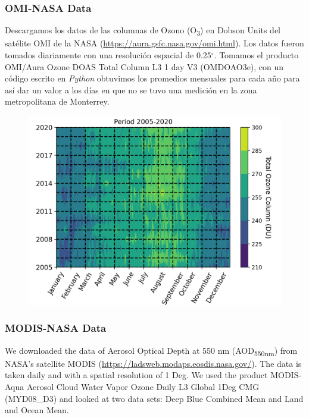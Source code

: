 \subsubsection{OMI-NASA Data}
Descargamos los datos de las columnas de Ozono (O\textsubscript{3}) en Dobson Units del satélite OMI de la NASA 
(\url{https://aura.gsfc.nasa.gov/omi.html}). Los datos fueron tomados diariamente con una resolución espacial de 0.25$^{\circ}$.
Tomamos el producto OMI/Aura Ozone DOAS Total Column L3 1 day V3 (OMDOAO3e), con un código escrito en \textit{Python} obtuvimos
los promedios mensuales para cada año para así dar un valor a los días en que no se tuvo una medición en la zona metropolitana de Monterrey.
\begin{figure}[H]
    \centering
    \includegraphics[scale=0.5]{images/OzonoDaily.png}
    \caption{}
    \label{fig:ozono_daily}
\end{figure}
\subsubsection{MODIS-NASA Data}
We downloaded the data of Aerosol Optical Depth at 550 nm (AOD\textsubscript{550nm}) from NASA’s
satellite MODIS (\url{https://ladsweb.modaps.eosdis.nasa.gov/}). The data is taken daily and with a spatial
resolution of 1 Deg. We used the product MODIS-Aqua Aerosol Cloud Water Vapor Ozone Daily L3 Global 1Deg CMG
(MYD08\_D3) and looked at two data sets: Deep Blue Combined Mean and Land and Ocean Mean. 
